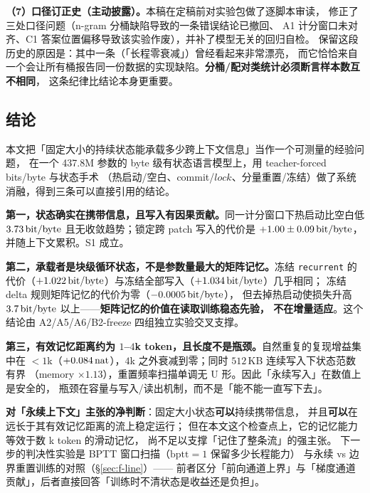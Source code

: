\textbf{（7）口径订正史（主动披露）。}本稿在定稿前对实验包做了逐脚本审读，
修正了三处口径问题（$\mathrm{n}$-gram 分桶缺陷导致的一条错误结论已撤回、
A1 计分窗口未对齐、C1 答案位置偏移导致该实验作废），并补了模型无关的回归自检。
保留这段历史的原因是：其中一条（「长程零衰减」）曾经看起来非常漂亮，
而它恰恰来自一个会让所有桶报告同一份数据的实现缺陷。\textbf{分桶/配对类统计必须断言样本数互不相同}，
这条纪律比结论本身更重要。

\subsection{结论}\label{sec:conclusion}

本文把「固定大小的持续状态能承载多少跨上下文信息」当作一个可测量的经验问题，
在一个 437.8M 参数的 byte 级有状态语言模型上，用 teacher-forced bits/byte 与状态手术
（热启动/空白、commit/$\mathit{lock}$、分量重置/冻结）做了系统消融，得到三条可以直接引用的结论。

\textbf{第一，状态确实在携带信息，且写入有因果贡献。}同一计分窗口下热启动比空白低 $3.73\,\mathrm{bit/byte}$
且无收敛趋势；锁定跨 patch 写入的代价是 $+1.00\pm0.09\,\mathrm{bit/byte}$，并随上下文累积。S1 成立。

\textbf{第二，承载者是块级循环状态，不是参数量最大的矩阵记忆。}冻结 \texttt{recurrent}
的代价（$+1.022\,\mathrm{bit/byte}$）与冻结全部写入（$+1.034\,\mathrm{bit/byte}$）几乎相同；
冻结 delta 规则矩阵记忆的代价为零（$-0.0005\,\mathrm{bit/byte}$），
但去掉热启动使损失升高 $3.7\,\mathrm{bit/byte}$ 以上——\textbf{矩阵记忆的价值在读取训练稳态先验，
不在增量适应}。这个结论由 A2/A5/A6/B2-freeze 四组独立实验交叉支撑。

\textbf{第三，有效记忆距离约为 $1$--$4$k token，且长度不是瓶颈。}自然重复的复现增益集中在
$<\!1$k（$+0.084\,\mathrm{nat}$），$4$k 之外衰减到零；同时 $512$\,KB 连续写入下状态范数有界
（memory $\times1.13$），重置频率扫描单调无 U 形。因此「永续写入」在数值上是安全的，
瓶颈在容量与写入/读出机制，而不是「能不能一直写下去」。

\textbf{对「永续上下文」主张的净判断}：固定大小状态\textbf{可以}持续携带信息，
并且\textbf{可以}在远长于其有效记忆距离的流上稳定运行；
但在本文这个检查点上，它的记忆能力等效于数 k token 的滑动记忆，
尚不足以支撑「记住了整条流」的强主张。
下一步的判决性实验是 BPTT 窗口扫描（$\mathrm{bptt}=1$ 保留多少长程能力）
与永续 vs 边界重置训练的对照（\S\ref{sec:f-line}）——
前者区分「前向通道上界」与「梯度通道贡献」，后者直接回答「训练时不清状态是收益还是负担」。
